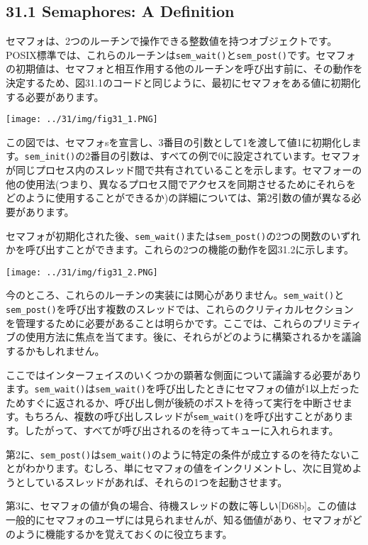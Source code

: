 \hypertarget{semaphores-a-definition}{%
\subsection*{31.1 Semaphores: A
Definition}\label{semaphores-a-definition}}

セマフォは、2つのルーチンで操作できる整数値を持つオブジェクトです。POSIX標準では、これらのルーチンは\texttt{sem\_wait()}と\texttt{sem\_post()}です。セマフォの初期値は、セマフォと相互作用する他のルーチンを呼び出す前に、その動作を決定するため、図31.1のコードと同じように、最初にセマフォをある値に初期化する必要があります。

\texttt{[image: ../31/img/fig31\_1.PNG]}

この図では、セマフォsを宣言し、3番目の引数として1を渡して値1に初期化します。\texttt{sem\_init()}の2番目の引数は、すべての例で0に設定されています。セマフォが同じプロセス内のスレッド間で共有されていることを示します。セマフォーの他の使用法(つまり、異なるプロセス間でアクセスを同期させるためにそれらをどのように使用することができるか)の詳細については、第2引数の値が異なる必要があります。

セマフォが初期化された後、\texttt{sem\_wait()}または\texttt{sem\_post()}の2つの関数のいずれかを呼び出すことができます。これらの2つの機能の動作を図31.2に示します。

\texttt{[image: ../31/img/fig31\_2.PNG]}

今のところ、これらのルーチンの実装には関心がありません。\texttt{sem\_wait()}と\texttt{sem\_post()}を呼び出す複数のスレッドでは、これらのクリティカルセクションを管理するために必要があることは明らかです。ここでは、これらのプリミティブの使用方法に焦点を当てます。後に、それらがどのように構築されるかを議論するかもしれません。

ここではインターフェイスのいくつかの顕著な側面について議論する必要があります。\texttt{sem\_wait()}は\texttt{sem\_wait()}を呼び出したときにセマフォの値が1以上だったためすぐに返されるか、呼び出し側が後続のポストを待って実行を中断させます。もちろん、複数の呼び出しスレッドが\texttt{sem\_wait()}を呼び出すことがあります。したがって、すべてが呼び出されるのを待ってキューに入れられます。

第2に、\texttt{sem\_post()}は\texttt{sem\_wait()}のように特定の条件が成立するのを待たないことがわかります。むしろ、単にセマフォの値をインクリメントし、次に目覚めようとしているスレッドがあれば、それらの1つを起動させます。

第3に、セマフォの値が負の場合、待機スレッドの数に等しい{[}D68b{]}。この値は一般的にセマフォのユーザには見られませんが、知る価値があり、セマフォがどのように機能するかを覚えておくのに役立ちます。

